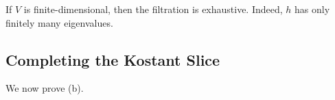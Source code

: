\documentclass[../notes.tex]{subfiles}
\begin{document}
\begin{remark}
	If $V$ is finite-dimensional, then the filtration is exhaustive. Indeed, $h$ has only finitely many eigenvalues.
\end{remark}

\subsection{Completing the Kostant Slice}
We now prove (b).
\end{document}
